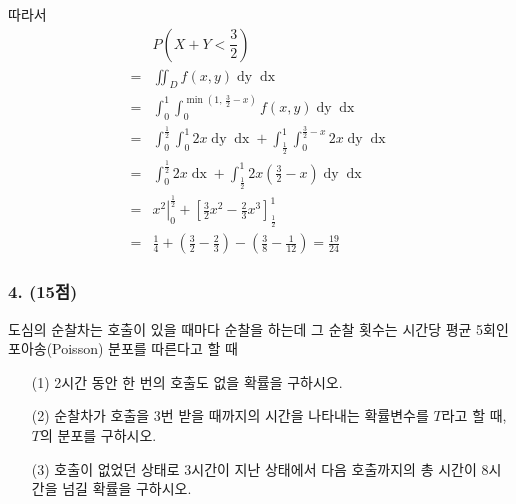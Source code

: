 \begin{itemize}
{\begin{center}
	\end{center}
	따라서
	\begin{align*}
		& P\left(X+Y<\dfrac{3}{2}\right) \\
		=& \iint_D f\left(x, y\right) \mathop{dy} \mathop{dx} \\
		=& \int_0^1 \int_0^{\mathop{\mathrm{min}} \left(1,\, \frac{3}{2} - x\right)} f\left(x, y\right) \mathop{dy} \mathop{dx} \\
		=& \int_0^\frac{1}{2} \int_0^1 2x \mathop{dy} \mathop{dx} + \int_\frac{1}{2}^1 \int_0^{\frac{3}{2} - x} 2x \mathop{dy} \mathop{dx} \\
		=& \int_0^\frac{1}{2} 2x \mathop{dx} + \int_\frac{1}{2}^1 2x\left(\frac{3}{2} - x\right) \mathop{dy} \mathop{dx} \\
		=& \left.x^2\right|_0^\frac{1}{2} + \left[\frac{3}{2}x^2 - \frac{2}{3}x^3\right]_\frac{1}{2}^1 \\
		=& \frac{1}{4} + \left(\frac{3}{2} - \frac{2}{3}\right) - \left(\frac{3}{8} - \frac{1}{12}\right) = \frac{19}{24}
	\end{align*}
    }
\end{itemize}

\subsubsection{4. (15점)} 도심의 순찰차는 호출이 있을 때마다 순찰을 하는데 그 순찰 횟수는 시간당 평균 5회인 포아송(Poisson) 분포를 따른다고 할 때

\begin{itemize}
    \item [(1)] 2시간 동안 한 번의 호출도 없을 확률을 구하시오.
    \item [(2)] 순찰차가 호출을 3번 받을 때까지의 시간을 나타내는 확률변수를 $T$라고 할 때, $T$의 분포를 구하시오.
    \item [(3)] 호출이 없었던 상태로 3시간이 지난 상태에서 다음 호출까지의 총 시간이 8시간을 넘길 확률을 구하시오.
\end{itemize}

